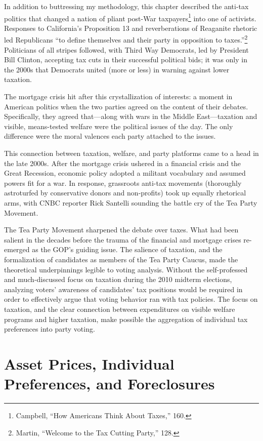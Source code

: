 \documentclass[12pt,oneside]{psthesis}
\begin{document}
In addition to buttressing my methodology, this chapter described the anti-tax politics that changed a nation of pliant post-War taxpayers\footnote{Campbell, ``How Americans Think About Taxes,'' 160.} into one of activists.
Responses to California's Proposition 13 and reverberations of Reaganite rhetoric led Republicans ``to define themselves and their party in opposition to taxes.''\footnote{Martin, ``Welcome to the Tax Cutting Party,'' 128.}
Politicians of all stripes followed, with Third Way Democrats, led by President Bill Clinton, accepting tax cuts in their successful political bids; it was only in the 2000s that Democrats united (more or less) in warning against lower taxation.

The mortgage crisis hit after this crystallization of interests: a moment in American politics when the two parties agreed on the content of their debates.
Specifically, they agreed that---along with wars in the Middle East---taxation and visible, means-tested welfare were the political issues of the day.
The only difference were the moral valences each party attached to the issues.

This connection between taxation, welfare, and party platforms came to a head in the late 2000s.
After the mortgage crisis ushered in a financial crisis and the Great Recession, economic policy adopted a militant vocabulary and assumed powers fit for a war.
In response, grassroots anti-tax movements (thoroughly astroturfed by conservative donors and non-profits) took up equally rhetorical arms, with CNBC reporter Rick Santelli sounding the battle cry of the Tea Party Movement.

The Tea Party Movement sharpened the debate over taxes.
What had been salient in the decades before the trauma of the financial and mortgage crises re-emerged as the GOP's guiding issue.
The salience of taxation, and the formalization of candidates as members of the Tea Party Caucus, made the theoretical underpinnings legible to voting analysis.
Without the self-professed and much-discussed focus on taxation during the 2010 midterm elections, analyzing voters' awareness of candidates' tax positions would be required in order to effectively argue that voting behavior ran with tax policies.
The focus on taxation, and the clear connection between expenditures on visible welfare programs and higher taxation, make possible the aggregation of individual tax preferences into party voting.

\hypertarget{methods}{%
\chapter{Asset Prices, Individual Preferences, and Foreclosures}\label{methods}}
\end{document}
